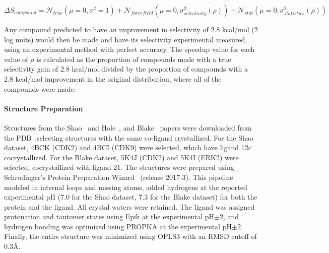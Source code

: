 \documentclass[9pt,lineno]{elife-modified} %
\begin{document}
 \begin{equation}\label{eq16}
 \Delta S_{compound} = \mathcal{N}_{true}(\mu =0, \sigma^2 = 1) + \mathcal{N}_{forcefield}(\mu =0, \sigma_{selectivity}^2(\rho)) + \mathcal{N}_{stat}(\mu =0, \sigma_{statistics}^2(\rho))
 \end{equation}
 
 Any compound predicted to have an improvement in selectivity of 2.8 kcal/mol (2 log units) would then be made and have its selectivity experimental measured, using an experimental method with perfect accuracy. The speedup value for each value of $\rho$ is calculated as the proportion of compounds made with a true selectivity gain of 2.8 kcal/mol divided by the proportion of compounds with a 2.8 kcal/mol improvement in the original distribution, where all of the compounds were made.
 
\paragraph{Structure Preparation}
Structures from the Shao~\citep{Shao2013-oe} and Hole~\citep{Hole2013-sr}, and Blake~\citep{Blake2016-su} papers were downloaded from the PDB~\citep{Berman2002-hg},selecting structures with the same co-ligand crystallized. For the Shao dataset, 4BCK (CDK2) and 4BCI (CDK9) were selected, which have ligand 12c cocrystallized. For the Blake dataset, 5K4J (CDK2) and 5K4I (ERK2) were selected, cocrystallized with ligand 21. The structures were prepared using Schrodinger’s Protein Preparation Wizard~\citep{Sastry2013-ax} (release 2017-3). This pipeline modeled in internal loops and missing atoms, added hydrogens at the reported experimental pH (7.0 for the Shao dataset, 7.3 for the Blake dataset) for both the protein and the ligand. All crystal waters were retained. The ligand was assigned protonation and tautomer states using Epik at the experimental pH$\pm2$, and hydrogen bonding was optimized using PROPKA at the experimental pH$\pm2$. Finally, the entire structure was minimized using OPLS3 with an RMSD cutoff of 0.3\AA.
\end{document}
